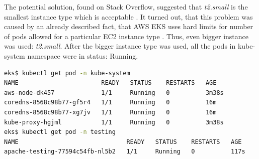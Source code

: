 The potential solution, found on Stack Overflow, suggested that \textit{t2.small} is the smallest instance type which is acceptable \cite{eks-instance-problem-so}. It turned out, that this problem was caused by an already described fact, that AWS EKS uses hard limits for number of pods allowed for a particular EC2 instance type \cite{eks-hard-limits}. Thus, even bigger instance was used: \textit{t2.small}. After the bigger instance type was used, all the pods in kube-system namespace were in status: Running.
\begin{lstlisting}[basicstyle=\tiny,caption={Verifying that all the pods are running},captionpos=b,language=Bash,xleftmargin=1cm]
eks$ kubectl get pod -n kube-system
NAME                       READY   STATUS    RESTARTS   AGE
aws-node-dk457             1/1     Running   0          3m38s
coredns-8568c98b77-gf5r4   1/1     Running   0          16m
coredns-8568c98b77-xg7jv   1/1     Running   0          16m
kube-proxy-hgjml           1/1     Running   0          3m38s
eks$ kubectl get pod -n testing
NAME                              READY   STATUS    RESTARTS   AGE
apache-testing-77594c54fb-nl5b2   1/1     Running   0          117s
\end{lstlisting}

